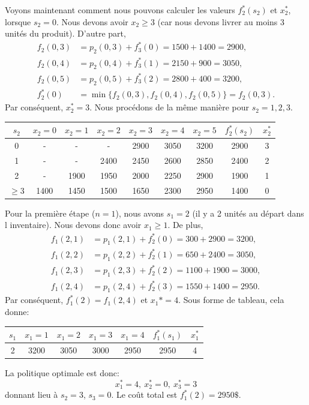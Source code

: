 \begin{example}
Voyons maintenant comment nous pouvons calculer les valeurs $f_2^*(s_2)$ et $x_2^*$, lorsque $s_2 = 0$.
Nous devons avoir $x_2 \geq 3$ (car nous devons livrer au moins 3 unités du produit).
D'autre part,
\begin{align*}
 f_2(0,3) &= p_2(0,3) + f_3^*(0) = 1500 + 1400 = 2900, \\
 f_2(0,4) &= p_2(0,4) + f_3^*(1) = 2150 + 900 = 3050, \\
 f_2(0,5) &= p_2(0,5) + f_3^*(2) = 2800 + 400 = 3200, \\
 f_2^*(0) &= \min \lbrace f_2(0,3), f_2(0,4), f_2(0,5) \rbrace = f_2(0,3).
\end{align*}
Par conséquent, $x_2^* = 3$.
Nous procédons de la même manière pour $s_2 = 1,2,3$.
\begin{center}
\begin{tabular}{|c|c|c|c|c|c|c|c|c|}
\hline
$s_2$ & $x_2 = 0$ & $x_2 = 1$ & $x_2 = 2$ & $x_2 = 3$ & $x_2 = 4$ & $x_2 = 5$ & $f_2^*(s_2)$ & $x_2^*$ \\
\hline
0 & - & - & - & 2900 & 3050 & 3200 & 2900 & 3 \\
\hline
1 & - & - & 2400 & 2450 & 2600 & 2850 & 2400 & 2 \\
\hline
2 & - & 1900 & 1950 & 2000 & 2250 & 2900 & 1900 & 1 \\
\hline
$\geq 3$ & 1400 & 1450 & 1500 & 1650 & 2300 & 2950 & 1400 & 0 \\
\hline
\end{tabular}
\end{center}
Pour la première étape ($n = 1$), nous avons $s_1 = 2$ (il y a 2 unités au départ dans l inventaire).
Nous devons donc avoir $x_1 \geq 1$. De plus,
\begin{align*}
 f_1(2,1) &= p_1(2,1) + f_2^*(0) = 300 + 2900 = 3200, \\
 f_1(2,2) &= p_1(2,2) + f_2^*(1) = 650 + 2400 = 3050, \\
 f_1(2,3) &= p_1(2,3) + f_2^*(2) = 1100 + 1900 = 3000, \\
 f_1(2,4) &= p_1(2,4) + f_2^*(3) = 1550 + 1400 = 2950.
\end{align*}
Par conséquent, $f_1^*(2) = f_1(2,4)$ et $x_1* = 4$.
Sous forme de tableau, cela donne:
\begin{center}
\begin{tabular}{|c|c|c|c|c|c|c|}
\hline
$s_1$ & $x_1=1$ & $x_1=2$ & $x_1=3$ & $x_1=4$ & $f_1^*(s_1)$ & $x_1^*$ \\
\hline
2 & 3200 & 3050 & 3000 & 2950 & 2950 & 4 \\
\hline
\end{tabular}
\end{center}
La politique optimale est donc:
\[
x_1^* = 4,\ x_2^* = 0,\ x_3^* = 3
\]
donnant lieu à $s_2 = 3$, $s_3 = 0$.
Le coût total est $f_1^*(2) = 2950\$$.
\end{example}

